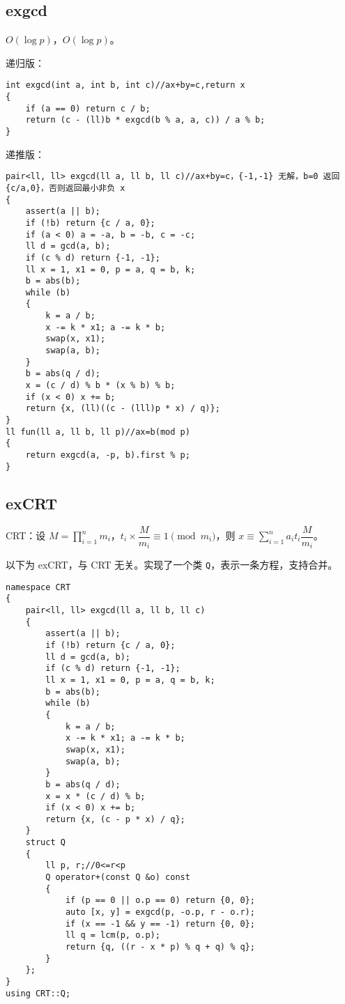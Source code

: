 \documentclass[12pt]{ctexart}
\begin{document}
\subsection{exgcd}

$O(\log p)$，$O(\log p)$。

递归版：

\begin{lstlisting}
int exgcd(int a, int b, int c)//ax+by=c,return x
{
	if (a == 0) return c / b;
	return (c - (ll)b * exgcd(b % a, a, c)) / a % b;
}

\end{lstlisting}

递推版：

\begin{lstlisting}
pair<ll, ll> exgcd(ll a, ll b, ll c)//ax+by=c，{-1,-1} 无解，b=0 返回 {c/a,0}，否则返回最小非负 x
{
	assert(a || b);
	if (!b) return {c / a, 0};
	if (a < 0) a = -a, b = -b, c = -c;
	ll d = gcd(a, b);
	if (c % d) return {-1, -1};
	ll x = 1, x1 = 0, p = a, q = b, k;
	b = abs(b);
	while (b)
	{
		k = a / b;
		x -= k * x1; a -= k * b;
		swap(x, x1);
		swap(a, b);
	}
	b = abs(q / d);
	x = (c / d) % b * (x % b) % b;
	if (x < 0) x += b;
	return {x, (ll)((c - (lll)p * x) / q)};
}
ll fun(ll a, ll b, ll p)//ax=b(mod p)
{
	return exgcd(a, -p, b).first % p;
}

\end{lstlisting}

\subsection{exCRT}

CRT：设 $M=\prod\limits_{i=1}^nm_i$，$t_i\times \dfrac {M}{m_i}\equiv 1\pmod {m_i}$，则 $x\equiv \sum\limits_{i=1}^na_it_i\dfrac {M}{m_i}$。

以下为 exCRT，与 CRT 无关。实现了一个类 \verb|Q|，表示一条方程，支持合并。

\begin{lstlisting}
namespace CRT
{
	pair<ll, ll> exgcd(ll a, ll b, ll c)
	{
		assert(a || b);
		if (!b) return {c / a, 0};
		ll d = gcd(a, b);
		if (c % d) return {-1, -1};
		ll x = 1, x1 = 0, p = a, q = b, k;
		b = abs(b);
		while (b)
		{
			k = a / b;
			x -= k * x1; a -= k * b;
			swap(x, x1);
			swap(a, b);
		}
		b = abs(q / d);
		x = x * (c / d) % b;
		if (x < 0) x += b;
		return {x, (c - p * x) / q};
	}
	struct Q
	{
		ll p, r;//0<=r<p
		Q operator+(const Q &o) const
		{
			if (p == 0 || o.p == 0) return {0, 0};
			auto [x, y] = exgcd(p, -o.p, r - o.r);
			if (x == -1 && y == -1) return {0, 0};
			ll q = lcm(p, o.p);
			return {q, ((r - x * p) % q + q) % q};
		}
	};
}
using CRT::Q;

\end{lstlisting}
\end{document}
